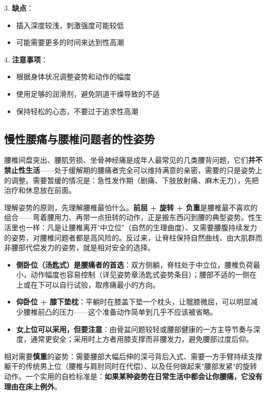\documentclass[12pt,UTF8]{ctexbook}
\begin{document}
3. \textbf{缺点}：
  \begin{itemize}
  \item 插入深度较浅，刺激强度可能较低
  \item 可能需要更多的时间来达到性高潮
  \end{itemize}

4. \textbf{注意事项}：
  \begin{itemize}
  \item 根据身体状况调整姿势和动作的幅度
  \item 使用足够的润滑剂，避免阴道干燥导致的不适
  \item 保持轻松的心态，不要过于追求性高潮
  \end{itemize}

\subsection{慢性腰痛与腰椎问题者的性姿势}

腰椎间盘突出、腰肌劳损、坐骨神经痛是成年人最常见的几类腰背问题，它们\textbf{并不禁止性生活}——处于缓解期的腰痛者完全可以维持满意的亲密，需要的只是姿势上的调整。需要暂缓的情况是：急性发作期（剧痛、下肢放射痛、麻木无力），先把治疗和休息放在前面。

理解姿势的原则，先理解腰椎最怕什么。\textbf{前屈 + 旋转 + 负重}是腰椎最不喜欢的组合——弯着腰用力、再带一点扭转的动作，正是搬东西闪到腰的典型姿势。性生活里也一样：凡是让腰椎离开"中立位"（自然的生理曲度）、又需要腰腹持续发力的姿势，对腰椎问题者都是高风险的。反过来，让脊柱保持自然曲线、由大肌群而非腰部代偿发力的姿势，就是相对安全的选择。

\begin{itemize}
	\item \textbf{侧卧位（汤匙式）是腰痛者的首选}：双方侧躺，脊柱处于中立位，腰椎负荷最小，动作幅度也容易控制（详见姿势章汤匙式姿势条目）；腰部不适的一侧在上或在下可以自行试验，取疼痛最小的方向。
	\item \textbf{仰卧位 + 膝下垫枕}：平躺时在膝盖下垫一个枕头，让髋膝微屈，可以明显减少腰椎前凸的压力——这个准备动作简单到几乎不应该被省略。
	\item \textbf{女上位可以采用，但要注意}：由骨盆问题较轻或腰部健康的一方主导节奏与深度，通常更安全；采用时上方者用膝支撑而非腰发力，避免腰部过度后仰。
\end{itemize}

相对需要\textbf{慎重}的姿势：需要腰部大幅后伸的深弓背后入式、需要一方手臂持续支撑躯干的传统男上位（腰椎与肩肘同时在代偿）、以及任何做起来"腰部发紧"的旋转动作。一个实用的自检标准是：\textbf{如果某种姿势在日常生活中都会让你腰痛，它没有理由在床上例外}。
\end{document}
